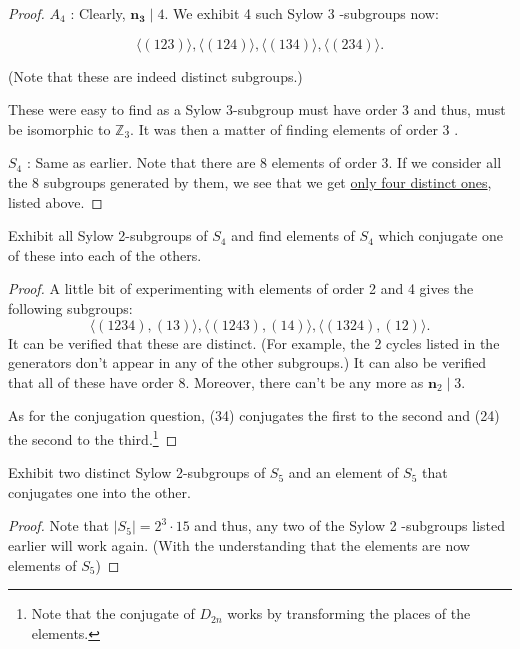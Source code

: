 \begin{proof}
$A_4$ : Clearly, $\boldsymbol{n}_{\mathbf{3}} \mid 4$. We exhibit 4 such Sylow 3 -subgroups now:

$$
\langle(123)\rangle,\langle(124)\rangle,\langle(134)\rangle,\langle(234)\rangle .
$$

(Note that these are indeed distinct subgroups.)

These were easy to find as a Sylow 3-subgroup must have order 3 and thus, must be isomorphic to $\mathbb{Z}_3$. It was then a matter of finding elements of order 3 .

$S_4$ : Same as earlier. Note that there are 8 elements of order 3. If we consider all the 8 subgroups generated by them, we see that we get \underline{only four distinct ones}, listed above.
\end{proof}


\begin{exercise}
Exhibit all Sylow 2-subgroups of $S_4$ and find elements of $S_4$ which conjugate one of these into each of the others.
\end{exercise}

\begin{proof}
A little bit of experimenting with elements of order 2 and 4 gives the following subgroups:
$$
\langle(1234),(13)\rangle,\langle(1243),(14)\rangle,\langle(1324),(12)\rangle .
$$
It can be verified that these are distinct. (For example, the 2 cycles listed in the generators don't appear in any of the other subgroups.) It can also be verified that all of these have order 8. Moreover, there can't be any more as $\boldsymbol{n}_2 \mid 3$.

As for the conjugation question, (34) conjugates the first to the second and (24) the second to the third.\footnote{Note that the conjugate of $D_{2n}$ works by transforming the places of the elements.}
\end{proof}


\begin{exercise}
Exhibit two distinct Sylow 2-subgroups of $S_5$ and an element of $S_5$ that conjugates one into the other.
\end{exercise}

\begin{proof}
Note that $\left|S_5\right|=2^3 \cdot 15$ and thus, any two of the Sylow 2 -subgroups listed earlier will work again. (With the understanding that the elements are now elements of $S_5$)
\end{proof}

